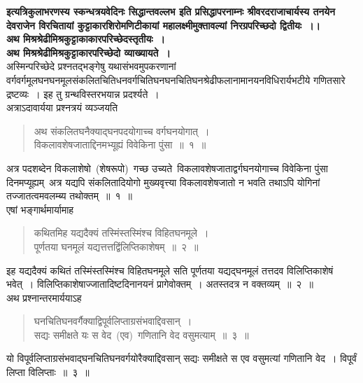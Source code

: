 \documentclass[11pt, openany]{book}
\begin{document}
\indent
\centering
\textbf{इत्यत्रिकुलाभरणस्य स्कन्धत्रयवेदिनः सिद्धान्तवल्लभ इति प्रसिद्धापरनाम्नः
श्रीवरदराजाचार्यस्य तनयेन देवराजेन विरचितायां कुट्टाकारशिरोमणिटीकायां महालक्ष्मीमुक्तावल्यां निरग्रपरिच्छदो द्वितीयः~।।}\\

\vspace{1cm}
\indent
\textbf{अथ मिश्रश्रेढीमिश्रकुट्टाकाकारपरिच्छेदस्तृतीयः~।}\\

\vspace{2mm}
\justifying
\indent
\textbf{अथ मिश्रश्रेढीमिश्रकुट्टाकारपरिच्छेदो व्याख्यायते~। }\\
अस्मिन्परिच्छेदे प्रश्नतद्भङ्गेषु यथासंभवमुपकरणानां वर्गवर्गमूलघनघनमूलसंकलितचितिधनवर्गचितिघनघनचितिघनश्रेढीफलानामानयनविधिरार्यभटीये गणितसारे द्रष्टव्यः~। इह तु ग्रन्थविस्तरभयान्न प्रदर्श्यते~।\\

\indent
अत्राऽदावार्यया प्रश्नत्रयं व्यञ्जयति\textendash

\begin{quote}
{\ks अथ संकलितघनैक्याद्घनपदयोगाच्च वर्गघनयोगात्~।\\
विकलावशेषजाताद्दिनमभ्यूह्यं विवेकिना पुंसा~॥~१~॥}
\end{quote}

\indent
अत्र पदशब्देन विकलाशेषो~(शेषरूपो)~गच्छ उच्यते\textendash\ विकलावशेषजाताद्वर्गघनयोगाच्च विवेकिना पुंसा दिनमप्यूह्यम्\textendash\ अत्र यद्यपि संकलितादियोगो मुख्यवृत्त्या विकलावशेषजातो न भवति तथाऽपि योगिनां तज्जातत्वमवलम्ब्य तथोक्तम्~॥~१~॥\\

\indent
एषां भङ्गार्थमार्यामाह\textendash

\begin{quote}
{\ks कथितमिह यद्यदैक्यं तस्मिंस्तस्मिंश्च विहितघनमूले~।\\
पूर्णतया घनमूलं यद्यत्तत्तद्विंलिप्तिकाशेषम्~॥~२~॥}
\end{quote}

\newpage
\thispagestyle{fancy}
\fancyhf{}

\indent
इह यद्यदैक्यं कथितं तस्मिंस्तस्मिंश्च विहितघनमूले सति पूर्णतया यद्यद्घनमूलं तत्तदव विलिप्तिकाशेषं भवेत्~। विलिप्तिकाशेषाज्जातादिष्टदिनानयनं प्रागेवोक्तम्~। अतस्तदत्र न वक्तव्यम्~॥~२~॥\\

\indent
अथ प्रश्नान्तरमार्ययाऽह\textendash
\begin{quote}
{\ks घनचितिघनवर्गैक्याद्विपूर्वलिप्ताग्रसंभवाद्दिवसान्~।\\
सद्यः समीक्षते यः स वेद~(एव)~गणितानि वेद वसुमत्याम्~॥~३~॥}
\end{quote}
\indent
यो विपूर्वलिप्ताग्रसंभवाद्घनचितिघनवर्गयोरैक्याद्दिवसान् सद्यः समीक्षते स एव वसुमत्यां गणितानि वेद~। विपूर्वं लिप्ता विलिप्ताः~॥~३~॥\\
\end{document}
